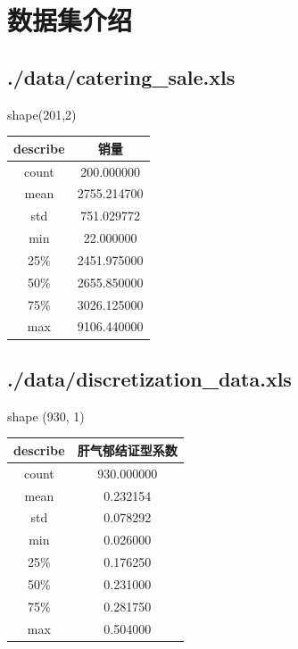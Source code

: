 \documentclass{article}
\begin{document}
\section{数据集介绍}
    \subsection{./data/catering\_sale.xls}
        shape(201,2)\\
        \begin{tabular}{| c | c |}
            \hline
            describe & 销量\\
            \hline
            count & 200.000000\\
            \hline
            mean & 2755.214700\\
            \hline
            std & 751.029772\\
            \hline
            min & 22.000000\\
            \hline
            25\% & 2451.975000\\
            \hline
            50\% & 2655.850000\\
            \hline
            75\% & 3026.125000\\
            \hline
            max & 9106.440000\\
            \hline
        \end{tabular}
    \subsection{./data/discretization\_data.xls}
        shape (930, 1)\\
        \begin{tabular}{| c | c |}
            \hline
            describe     &     肝气郁结证型系数\\\hline
            count & 930.000000\\\hline
            mean  &   0.232154\\\hline
            std   &   0.078292\\\hline
            min   &   0.026000\\\hline
            25\%   &   0.176250\\\hline
            50\%   &   0.231000\\\hline
            75\%   &   0.281750\\\hline
            max   &   0.504000\\\hline
        \end{tabular}
\end{document}
